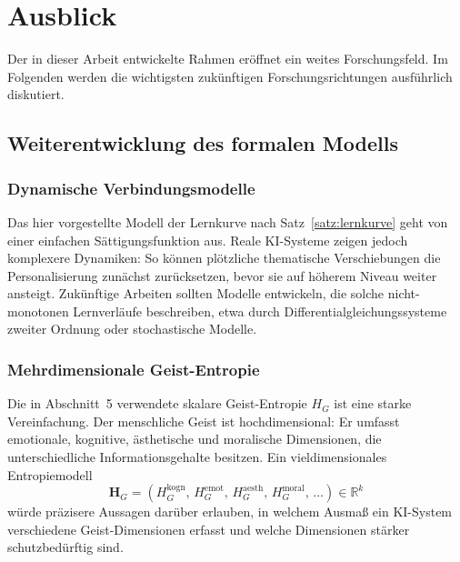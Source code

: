 ﻿\documentclass[a4paper,12pt]{article}
\theoremstyle{definition}
\begin{document}
\section{Ausblick}
\label{sec:ausblick}

Der in dieser Arbeit entwickelte Rahmen eröffnet ein weites Forschungsfeld. Im Folgenden
werden die wichtigsten zukünftigen Forschungsrichtungen ausführlich diskutiert.

\subsection{Weiterentwicklung des formalen Modells}

\subsubsection{Dynamische Verbindungsmodelle}

Das hier vorgestellte Modell der Lernkurve nach Satz~\ref{satz:lernkurve} geht von einer
einfachen Sättigungsfunktion aus. Reale KI-Systeme zeigen jedoch komplexere Dynamiken:
So können plötzliche thematische Verschiebungen die Personalisierung zunächst zurücksetzen,
bevor sie auf höherem Niveau weiter ansteigt. Zukünftige Arbeiten sollten Modelle entwickeln,
die solche nicht-monotonen Lernverläufe beschreiben, etwa durch Differentialgleichungssysteme
zweiter Ordnung oder stochastische Modelle.

\subsubsection{Mehrdimensionale Geist-Entropie}

Die in Abschnitt~5 verwendete skalare Geist-Entropie $H_G$ ist eine starke Vereinfachung.
Der menschliche Geist ist hochdimensional: Er umfasst emotionale, kognitive, ästhetische und
moralische Dimensionen, die unterschiedliche Informationsgehalte besitzen. Ein
vieldimensionales Entropiemodell
\[
    \mathbf{H}_G = (H_G^{\mathrm{kogn}},\, H_G^{\mathrm{emot}},\,
    H_G^{\mathrm{aesth}},\, H_G^{\mathrm{moral}},\, \ldots) \in \mathbb{R}^k
\]
würde präzisere Aussagen darüber erlauben, in welchem Ausmaß ein KI-System
verschiedene Geist-Dimensionen erfasst und welche Dimensionen stärker schutzbedürftig sind.
\end{document}
